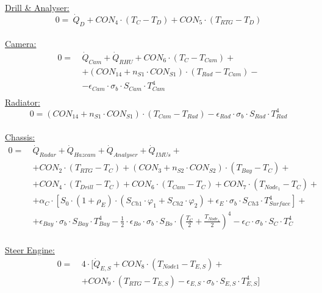 \underline{Drill \& Analyser:}
\begin{equation} 0= \ \dot{Q}_{D} +CON_4 \cdot (T_{C}-T_{D})+CON_5 \cdot (T_{RTG}-T_{D})   \end{equation} \\
%
\underline{Camera:}
\begin{equation}
\begin{aligned}
0=\  &  \dot{Q}_{Cam} + \dot{Q}_{RHU} +CON_6 \cdot (T_{C}-T_{Cam})+ \\[1em]
& +(CON_{14} +n_{S1}\cdot CON_{S1}) \cdot (T_{Rad}-T_{Cam})  -\\[1em]
& - \epsilon_{Cam}\cdot \sigma_b \cdot S_{Cam}\cdot T_{Cam}^4 \\[2em]
\end{aligned}
\end{equation}
%
\underline{Radiator:}
\begin{equation}0=(CON_{14} +n_{S1}\cdot CON_{S1}) \cdot (T_{Cam}-T_{Rad}) - \epsilon_{Rad}\cdot \sigma_b \cdot S_{Rad}\cdot T_{Rad}^4  \end{equation}  \\
%
\underline{Chassis:}
\begin{equation}
\begin{aligned}
0=\  &   \dot{Q}_{Radar}+\dot{Q}_{Hazcam} +\dot{Q}_{Analyser} +\dot{Q}_{IMUs} +\\[1em]
	& +CON_2 \cdot (T_{RTG}-T_{C})+(CON_3+n_{S2}\cdot CON_{S2})\cdot (T_{Bay}-T_{C})+ \\[1em]
&  +  CON_4 \cdot (T_{Drill}-T_{C})+CON_6 \cdot (T_{Cam}-T_{C})+CON_7 \cdot (T_{Node_1}-T_{C}) +  \\[1em]
&  + \alpha_{C}\cdot [ S_0 \cdot (1+\rho_E) \cdot (S_{Ch1} \cdot \varphi_1  +S_{Ch2} \cdot \varphi_2 ) +   \epsilon_{E} \cdot \sigma_b \cdot S_{Ch3}\cdot T_{Surface}^4 ]+  \\[1em]
& +\epsilon_{Bay}\cdot \sigma_b \cdot S_{Bay}\cdot T_{Bay}^4 - \frac{1}{2} \cdot \epsilon_{Bo}\cdot \sigma_b \cdot S_{Bo}\cdot \left( \frac{T_{C}}{2} +\frac{T_{Node_1}}{2}  \right)^4  -\epsilon_{C}\cdot \sigma_b \cdot S_{C}\cdot T_{C}^4 \\[2em]
\end{aligned}
\end{equation}

\underline{Steer Engine:}
\begin{equation}
\begin{aligned}
0=\  &  4\cdot [\dot{Q}_{E,S} +CON_8  \cdot (T_{Node1}-T_{E,S})+ \\[1em]
&   +CON_9 \cdot (T_{RTG}-T_{E,S}) -\epsilon_{E,S}\cdot \sigma_b \cdot S_{E,S}\cdot T_{E,S}^4] \\[2em]
\end{aligned}
\end{equation}

